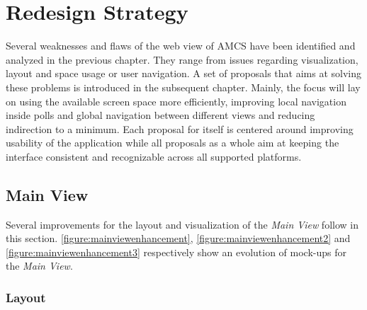 \chapter{Redesign Strategy}
\label{chapter:redesignstrategy}
Several weaknesses and flaws of the web view of AMCS have been identified and analyzed in the previous chapter. They range from issues regarding visualization, layout and space usage or user navigation.
A set of proposals that aims at solving these problems is introduced in the subsequent chapter. Mainly, the focus will lay on using the available screen space more efficiently, improving local navigation inside polls and global navigation between different views and reducing indirection to a minimum. Each proposal for itself is centered around improving usability of the application while all proposals as a whole aim at keeping the interface consistent and recognizable across all supported platforms.

\section{Main View}

Several improvements for the layout and visualization of the \emph{Main View} follow in this section. \autoref{figure:mainviewenhancement}, \autoref{figure:mainviewenhancement2} and \autoref{figure:mainviewenhancement3} respectively show an evolution of mock-ups for the \emph{Main View}.
\subsection{Layout}
\label{section:con:proposals:mainview:layout}
